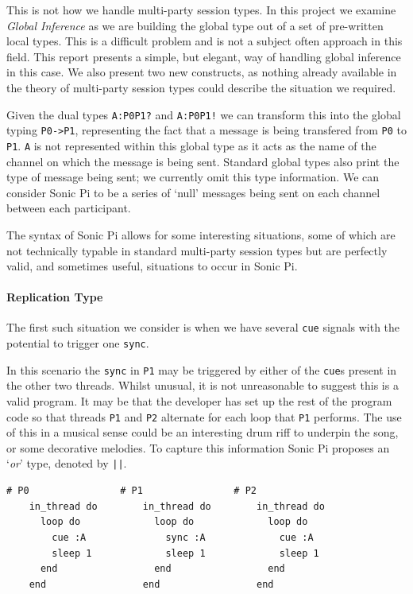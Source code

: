 \documentclass[11pt, abstracton, twoside, titlepage=true]{scrartcl}
\begin{document}
This is not how we handle multi-party session types. In this project we examine 
\emph{Global Inference} as we are building the global type out of a set of pre-written 
local types. This is a difficult problem and is not a subject often approach in this 
field. This report presents a simple, but elegant, way of handling global inference 
in this case. We also present two new constructs, as nothing already available in 
the theory of multi-party session types could describe the situation we required.

Given the dual types \texttt{A:P0P1?} and \texttt{A:P0P1!} we can transform 
this into the global typing \texttt{P0->P1}, representing the fact that a 
message is being transfered from \texttt{P0} to \texttt{P1}. \texttt{A} is not
represented within this global type as it acts as the name of the channel on
which the message is being sent. Standard global types also print the type of 
message being sent; we currently omit this type information. We can consider Sonic 
Pi to be a series of `null' messages being sent on each channel between each 
participant.

The syntax of Sonic Pi allows for some interesting situations,
some of which are not technically typable in standard multi-party session types 
but are perfectly valid, and sometimes useful, situations to occur in Sonic Pi.
\newpage

\paragraph{Replication Type}
The first such situation we consider is when we have several \texttt{cue}
signals with the potential to trigger one \texttt{sync}.

In this scenario the \texttt{sync} in \texttt{P1} may be triggered by either
of the \texttt{cue}s present in the other two threads. Whilst unusual,
it is not unreasonable to suggest this is a valid program. It may be that the
developer has set up the rest of the program code so that threads \texttt{P1} 
and \texttt{P2} alternate for each loop that \texttt{P1} performs. The use
of this in a musical sense could be an interesting drum riff to underpin the
song, or some decorative melodies. To capture this information Sonic Pi 
proposes an `\emph{or}' type, denoted by \texttt{||}. 


\begin{minipage}{\textwidth}
	\begin{lstlisting}[style = sonicpi]
    # P0                # P1                # P2
    in_thread do        in_thread do        in_thread do
      loop do             loop do             loop do
        cue :A              sync :A             cue :A
        sleep 1             sleep 1             sleep 1
      end                 end                 end
    end                 end                 end
	\end{lstlisting}
\end{minipage}
\end{document}
